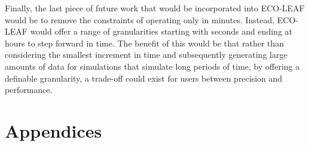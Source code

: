 \documentclass{l4proj}
\begin{document}
Finally, the last piece of future work that would be incorporated into ECO-LEAF would be to remove the constraints of operating only in minutes.
Instead, ECO-LEAF would offer a range of granularities starting with seconds and ending at hours to step forward in time.
The benefit of this would be that rather than considering the smallest increment in time and subsequently generating large amounts of data for simulations that simulate long periods of time, by offering a definable granularity, a trade-off could exist for users between precision and performance.
%
% 
\chapter{Appendices}
\clearpage
\end{document}
